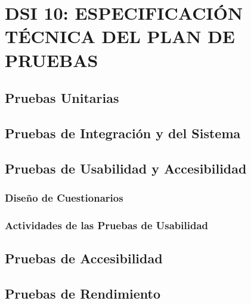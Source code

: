 \newpage
\section{DSI 10: ESPECIFICACIÓN TÉCNICA DEL PLAN DE PRUEBAS}

\subsection{Pruebas Unitarias} 

\subsection{Pruebas de Integración y del Sistema} 

\subsection{Pruebas de Usabilidad y Accesibilidad} 

\subsubsection{Diseño de Cuestionarios} 

\subsubsection{Actividades de las Pruebas de Usabilidad} 


\subsection{Pruebas de Accesibilidad} 

\subsection{Pruebas de Rendimiento} 
